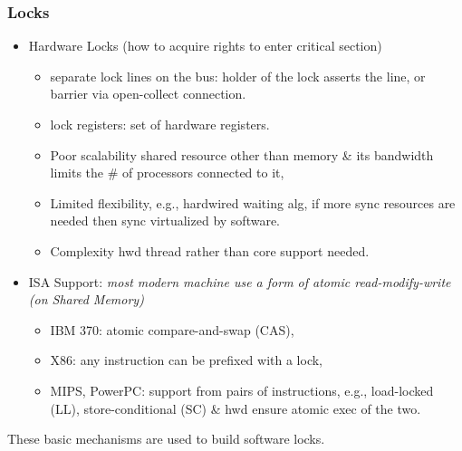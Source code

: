 \documentclass{beamer}
\renewcommand{\emph}[1]{\textcolor{structure}{#1}}
\newcommand{\emp}[1]{\textcolor{DikuRed}{ #1}}
\begin{document}
\begin{frame}[fragile,t]
\frametitle{Locks}

\begin{itemize}
    \item \emp{Hardware Locks} (how to acquire rights to enter critical section)\smallskip
        \begin{itemize}
            \item separate \emp{lock lines on the bus}: holder of the lock asserts the line,
                    or barrier via open-collect connection.
            \item \emp{lock registers}: set of hardware registers.
            \item \alert{Poor scalability} shared resource other than memory \& its bandwidth limits the \# of processors connected to it, 
            \item \alert{Limited flexibility}, e.g., hardwired waiting alg, 
                    if more sync resources are needed then sync virtualized by software. 
            \item \alert{Complexity} hwd thread rather than core support needed.  
        \end  {itemize}\bigskip

    \item \emph{ISA Support: {\em most modern machine use a form of atomic read-modify-write (on Shared Memory)}}\smallskip
        \begin{itemize}
            \item IBM 370: atomic compare-and-swap (CAS),
            \item X86: any instruction can be prefixed with a lock,
            \item MIPS, PowerPC: support from pairs of instructions, 
                    e.g., load-locked (LL), store-conditional (SC) \& hwd ensure atomic exec of the two.
        \end  {itemize}\medskip
\end{itemize}

\emph{These basic mechanisms are used to build software locks.}

\end{frame}
\end{document}
